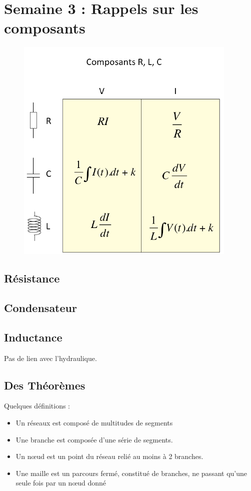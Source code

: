 \documentclass[12pt,a4paper]{article}
\begin{document}
\section{Semaine 3 : Rappels sur les composants}
\begin{figure}[!h]
	\centering
	\includegraphics[scale=0.5]{images/resume_composants}
\end{figure}
\subsection{Résistance}
\subsection{Condensateur}
\subsection{Inductance}
Pas de lien avec l'hydraulique. 

\subsection{Des Théorèmes}
Quelques définitions : 
\begin{itemize}
	\item 	Un réseaux est composé de multitudes de segments
	\item 	Une branche est composée d'une série de segments.
	\item 	Un n\oe ud est un point du réseau relié au moins à 2 branches.
	\item 	Une maille est un parcours fermé, constitué de branches, ne passant qu'une seule fois par un n\oe ud donné 
\end{itemize}
\end{document}
